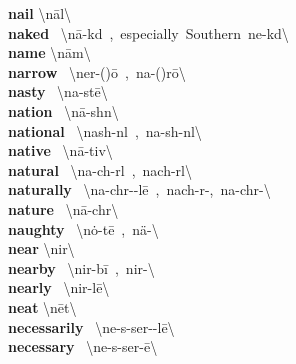 \documentclass[10pt,a4paper]{article}
\begin{document}
\begin{multicols}{2}
\textbf{ nail }\quad \textbackslash \textprimstress n\={a}l\textbackslash \\
\textbf{ naked }\quad \ \textbackslash \textprimstress n\={a}-k\textschwa d\ ,\ especially\ Southern\ \textprimstress ne-k\textschwa d\textbackslash \\
\textbf{ name }\quad \textbackslash \textprimstress n\={a}m\textbackslash \\
\textbf{ narrow }\quad \ \textbackslash \textprimstress ner-(\textsecstress )\={o}\ ,\ \textprimstress na-(\textsecstress )r\={o}\textbackslash \\
\textbf{ nasty }\quad \ \textbackslash \textprimstress na-st\={e}\textbackslash \\
\textbf{ nation }\quad \ \textbackslash \textprimstress n\={a}-sh\textschwa n\textbackslash \\
\textbf{ national }\quad \ \textbackslash \textprimstress nash-n\textschwa l\ ,\ \textprimstress na-sh\textschwa -n\textsuperscript{\textreve}l\textbackslash \\
\textbf{ native }\quad \ \textbackslash \textprimstress n\={a}-tiv\textbackslash \\
\textbf{ natural }\quad \ \textbackslash \textprimstress na-ch\textschwa -r\textschwa l\ ,\ \textprimstress nach-r\textschwa l\textbackslash \\
\textbf{ naturally }\quad \ \textbackslash \textprimstress na-ch\textschwa r-\textschwa -l\={e}\ ,\ \textprimstress nach-r\textschwa -,\ \textprimstress na-ch\textschwa r-\textbackslash \\
\textbf{ nature }\quad \ \textbackslash \textprimstress n\={a}-ch\textschwa r\textbackslash \\
\textbf{ naughty }\quad \ \textbackslash \textprimstress n\.{o}-t\={e}\ ,\ \textprimstress n\"{a}-\textbackslash \\
\textbf{ near }\quad \textbackslash \textprimstress nir\textbackslash \\
\textbf{ nearby }\quad \ \textbackslash nir-\textprimstress b\={i}\ ,\ \textprimstress nir-\textsecstress \textbackslash \\
\textbf{ nearly }\quad \ \textbackslash \textprimstress nir-l\={e}\textbackslash \\
\textbf{ neat }\quad \textbackslash \textprimstress n\={e}t\textbackslash \\
\textbf{ necessarily }\quad \ \textbackslash \textsecstress ne-s\textschwa -\textprimstress ser-\textschwa -l\={e}\textbackslash \\
\textbf{ necessary }\quad \ \textbackslash \textprimstress ne-s\textschwa -\textsecstress ser-\={e}\textbackslash \\

\end{multicols}
\end{document}
